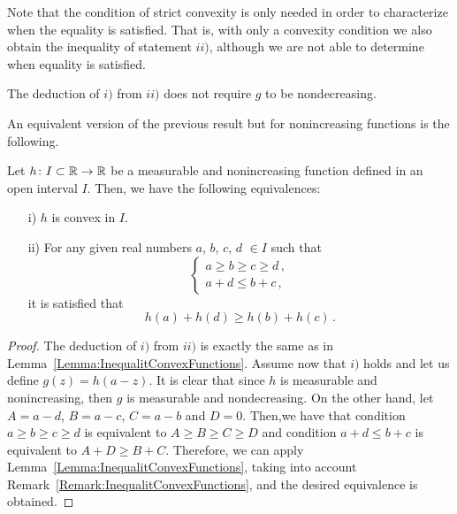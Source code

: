 \begin{remark}
\label{Remark:InequalitConvexFunctions} Note that the condition of strict convexity is only needed
in order to characterize when the equality is satisfied. That is, with only a convexity condition
we also obtain the inequality of statement $ii)$, although we are not able to determine when equality is satisfied.
\end{remark}
\begin{remark}
\label{Remark:LeftImplicationDoNotRequireNondecreasing}
The deduction of $i)$ from $ii)$ does not require $g$ to be nondecreasing.
\end{remark}

An equivalent version of the previous result but for nonincreasing functions is the following.

\begin{corollary}
\label{Cor:hDecreasingConvex} Let $h \colon I\subset \mathbb{R} \to \mathbb{R}$ be a measurable and nonincreasing function defined in an open
interval $I$. Then, we have the following
equivalences:
\begin{enumerate}
\item[i)] $h$ is convex in $I$.
\item[ii)] For any given real numbers $a$, $b$, $c$, $d$ $\in I$ such that
\begin{equation*}
\begin{cases}
a \geq b \geq c \geq d \,, \\
a + d \leq b + c\,,
\end{cases}
\end{equation*}
it is satisfied that
$$ h(a) + h(d) \geq h(b) + h(c)\,.$$
\end{enumerate}
\end{corollary}

\begin{proof}
	The deduction of $i)$ from $ii)$ is exactly the same as in Lemma~\ref{Lemma:InequalitConvexFunctions}. Assume now that $i)$ holds and let us define $g(z) = h(a-z)$. It is clear that since $h$ is measurable and nonincreasing, then $g$ is measurable and nondecreasing. On the other hand, let $A=a-d$, $B=a-c$, $C=a-b$ and $D=0$. Then,we have that condition $a \geq b \geq c \geq d$ is equivalent to $A\geq B \geq C \geq D$ and condition $a+d\leq b+c$ is equivalent to $A+D\geq B+C$. Therefore, we can apply Lemma~\ref{Lemma:InequalitConvexFunctions}, taking into account Remark~\ref{Remark:InequalitConvexFunctions}, and the desired equivalence is obtained.
\end{proof}

